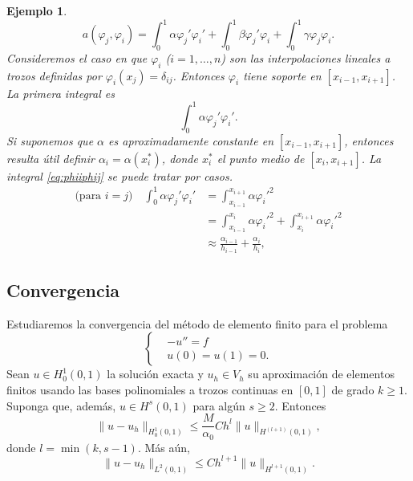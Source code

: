 \documentclass[11pt,letterpaper]{report}
\newtheorem{example}{Ejemplo}
\renewcommand\phi\varphi
\begin{document}
\begin{example}
  \begin{equation}
    a(\phi_j,\phi_i)
    = \int_{0}^{1} \alpha\phi_j'\phi_i'
    +
    \int_{0}^{1}\beta\phi_j'\phi_i
    +
    \int_{0}^{1}\gamma\phi_j\phi_i
  .\end{equation}
  Consideremos el caso en que $\phi_i$ ($i=1,\dots,n$) son las
  interpolaciones lineales a trozos definidas por
  $\phi_i(x_j)=\delta_{ij}$. Entonces $\phi_i$ tiene soporte en
  $[x_{i-1},x_{i+1}]$.
  La primera integral es
  \begin{equation}\label{eq:phiiphij}
    \int_{0}^{1} \alpha\phi_j'\phi_i'
  .\end{equation}
  Si suponemos que $\alpha$ es aproximadamente
  constante en $[x_{i-1},x_{i+1}]$, entonces resulta útil definir
  $\alpha_{i}=\alpha(x_i^{*})$, donde $x_i^{*}$ el punto
  medio de $[x_i,x_{i+1}]$. La integral \eqref{eq:phiiphij}
  se puede tratar por casos.
  \begin{align}
    \text{(para $i=j$)}\quad
    \int_{0}^{1} \alpha\phi_j'\phi_i'
    &= \int_{x_{i-1}}^{x_{i+1}}\alpha\phi_i'^{2} \\
    &= \int_{x_{i-1}}^{x_{i}}\alpha\phi_i'^{2}
    + \int_{x_{i}}^{x_{i+1}}\alpha\phi_i'^{2} \\
    &\approx \frac{\alpha_{i-1}}{h_{i-1}} + \frac{\alpha_i}{h_i}
  ,\end{align}
\end{example}

\subsection{Convergencia}

Estudiaremos la convergencia del método de elemento finito para el
problema
\begin{equation}
  \left\{
    \begin{aligned}
      & -u'' = f
      \\
      & u(0) = u(1)=0.
    \end{aligned}
  \right.
\end{equation}
Sean $u\in H_{0}^{1}(0,1)$ la solución exacta y $u_h\in V_h$ su
aproximación de elementos finitos usando las bases polinomiales a
trozos continuas en $[0,1]$ de grado $k\geq 1$. Suponga que, además,
$u\in H^{s}(0,1)$ para algún $s\geq 2$. Entonces
\begin{equation}
  \|u-u_h\|_{H^{1}_0(0,1)}
  \leq
  \frac{M}{\alpha_0} Ch^l\|u\|_{H^{(l+1)}(0,1)}
,\end{equation}
donde $l=\min(k,s-1)$. Más aún,
\begin{equation}
  \|u-u_h\|_{L^{2}(0,1)}
  \leq
  Ch^{l+1}\|u\|_{H^{l+1}(0,1)}
.\end{equation}
\end{document}
